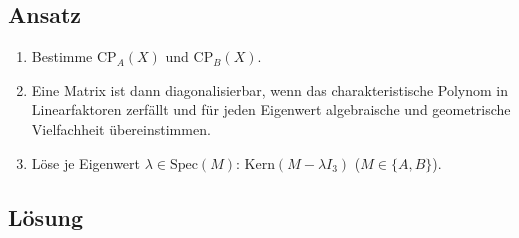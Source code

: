 \subsection{Ansatz}
\begin{enumerate}
	\item Bestimme \( \text{CP}_A(X) \) und \( \text{CP}_B(X) \).
	\item Eine Matrix ist dann diagonalisierbar, wenn das charakteristische Polynom in Linearfaktoren zerfällt und für jeden Eigenwert algebraische und geometrische Vielfachheit übereinstimmen.
	\item Löse je Eigenwert \( \lambda \in \text{Spec}(M) \): \( \text{Kern}(M - \lambda I_3) \) (\( M \in \{ A, B \} \)). 
\end{enumerate}

\subsection{Lösung}
